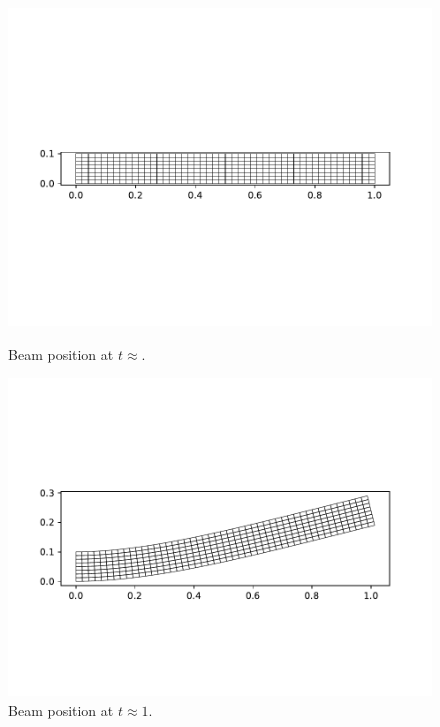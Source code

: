 \documentclass{report}
\begin{document}
\begin{figure}[h]
\centering
\begin{minipage}[t]{0.45\textwidth}
\centering
\includegraphics[width=\textwidth]{../Plots/Project3_main/Figure_1.pdf}
\caption{Beam position at $t\approx$.}
\label{pl:beam_soln_initial}
\end{minipage}
\hfill
\begin{minipage}[t]{0.45\textwidth}
\centering
\includegraphics[width=\textwidth]{../Plots/Project3_main/Figure_5.pdf}
\caption{Beam position at $t\approx1$.}
\label{pl:beam_soln_position1}
\end{minipage}
\end{figure}
\end{document}
